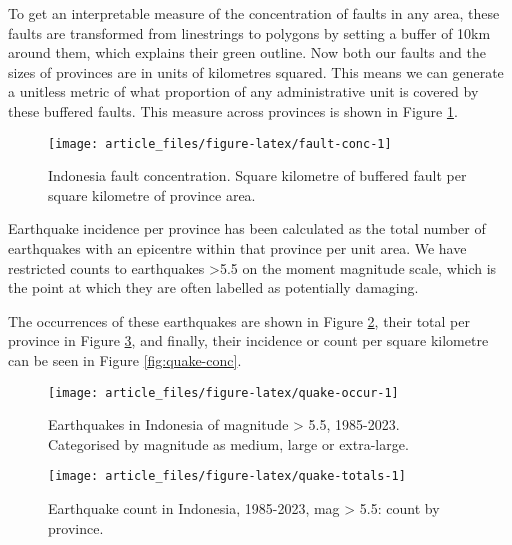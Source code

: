 To get an interpretable measure of the concentration of faults in any area,
these faults are transformed from linestrings to polygons by setting a buffer of
10km around them, which explains their green outline. Now both our faults and the sizes of provinces are in units of kilometres
squared. This means we can generate a unitless metric of what proportion of any administrative unit
is covered by these buffered faults. This measure across provinces is shown in Figure
\ref{fig:fault-conc}.

\begin{figure}

{\centering \texttt{[image: article\_files/figure-latex/fault-conc-1]} 

}

\caption{Indonesia fault concentration. Square kilometre of buffered fault per square kilometre of province area. }\label{fig:fault-conc}
\end{figure}

Earthquake incidence per province has been calculated as the total number of earthquakes with
an epicentre within that province per unit area. We have
restricted counts to earthquakes \textgreater5.5 on the moment magnitude scale, which is the point
at which they are often labelled as potentially damaging.

The occurrences of these earthquakes are shown in Figure \ref{fig:quake-occur}, their total per province in Figure \ref{fig:quake-totals}, and finally, their incidence or count per square kilometre can be seen in Figure \ref{fig:quake-conc}.

\begin{figure}

{\centering \texttt{[image: article\_files/figure-latex/quake-occur-1]} 

}

\caption{Earthquakes in Indonesia of magnitude > 5.5, 1985-2023. Categorised by magnitude as medium, large or extra-large. }\label{fig:quake-occur}
\end{figure}

\begin{figure}

{\centering \texttt{[image: article\_files/figure-latex/quake-totals-1]} 

}

\caption{Earthquake count in Indonesia, 1985-2023, mag > 5.5: count by province. }\label{fig:quake-totals}
\end{figure}

